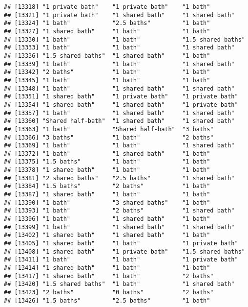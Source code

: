 \documentclass[
]{article}
\begin{document}
\begin{verbatim}
## [13318] "1 private bath"    "1 private bath"    "1 bath"           
## [13321] "1 private bath"    "1 shared bath"     "1 shared bath"    
## [13324] "1 bath"            "2.5 baths"         "1 bath"           
## [13327] "1 shared bath"     "1 bath"            "1 bath"           
## [13330] "1 bath"            "1 bath"            "1.5 shared baths" 
## [13333] "1 bath"            "1 bath"            "1 shared bath"    
## [13336] "1.5 shared baths"  "1 shared bath"     "1 bath"           
## [13339] "1 bath"            "1 bath"            "1 shared bath"    
## [13342] "2 baths"           "1 bath"            "1 bath"           
## [13345] "1 bath"            "1 bath"            "1 bath"           
## [13348] "1 bath"            "1 shared bath"     "1 shared bath"    
## [13351] "1 shared bath"     "1 private bath"    "1 private bath"   
## [13354] "1 shared bath"     "1 shared bath"     "1 private bath"   
## [13357] "1 bath"            "1 shared bath"     "1 shared bath"    
## [13360] "Shared half-bath"  "1 shared bath"     "1 shared bath"    
## [13363] "1 bath"            "Shared half-bath"  "3 baths"          
## [13366] "3 baths"           "1 bath"            "2 baths"          
## [13369] "1 bath"            "1 bath"            "1 shared bath"    
## [13372] "1 bath"            "1 shared bath"     "1 bath"           
## [13375] "1.5 baths"         "1 bath"            "1 bath"           
## [13378] "1 shared bath"     "1 bath"            "1 bath"           
## [13381] "2 shared baths"    "2.5 baths"         "1 shared bath"    
## [13384] "1.5 baths"         "2 baths"           "1 bath"           
## [13387] "1 shared bath"     "1 bath"            "1 bath"           
## [13390] "1 bath"            "3 shared baths"    "1 bath"           
## [13393] "1 bath"            "2 baths"           "1 shared bath"    
## [13396] "1 bath"            "1 shared bath"     "1 bath"           
## [13399] "1 bath"            "1 shared bath"     "1 shared bath"    
## [13402] "1 shared bath"     "1 shared bath"     "1 bath"           
## [13405] "1 shared bath"     "1 bath"            "1 private bath"   
## [13408] "1 shared bath"     "1 private bath"    "1.5 shared baths" 
## [13411] "1 bath"            "1 bath"            "1 private bath"   
## [13414] "1 shared bath"     "1 bath"            "1 bath"           
## [13417] "1 shared bath"     "1 bath"            "2 baths"          
## [13420] "1.5 shared baths"  "1 bath"            "1 shared bath"    
## [13423] "2 baths"           "0 baths"           "2 baths"          
## [13426] "1.5 baths"         "2.5 baths"         "1 bath"           

\end{verbatim}
\end{document}

